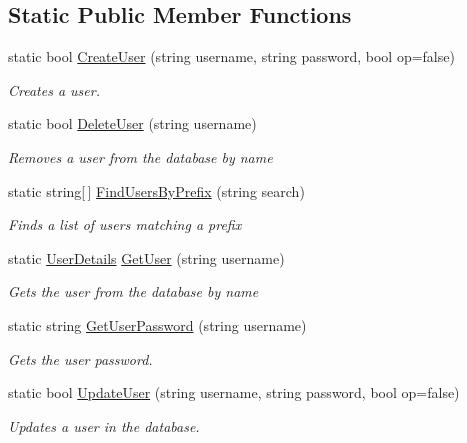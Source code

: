 \subsection*{Static Public Member Functions}
\begin{DoxyCompactItemize}
\item 
static bool \hyperlink{classOTA_1_1Data_1_1AuthenticatedUsers_aea3a1899697ab77fa32d5fa7bffdae7a}{Create\+User} (string username, string password, bool op=false)
\begin{DoxyCompactList}\small\item\em Creates a user. \end{DoxyCompactList}\item 
static bool \hyperlink{classOTA_1_1Data_1_1AuthenticatedUsers_a1cea5a0e7137a60a0fa4a75dc58d93a2}{Delete\+User} (string username)
\begin{DoxyCompactList}\small\item\em Removes a user from the database by name \end{DoxyCompactList}\item 
static string\mbox{[}$\,$\mbox{]} \hyperlink{classOTA_1_1Data_1_1AuthenticatedUsers_ad1cb6c1e7e101243cf1aef7f334048e4}{Find\+Users\+By\+Prefix} (string search)
\begin{DoxyCompactList}\small\item\em Finds a list of users matching a prefix \end{DoxyCompactList}\item 
static \hyperlink{structOTA_1_1Data_1_1UserDetails}{User\+Details} \hyperlink{classOTA_1_1Data_1_1AuthenticatedUsers_affa1cab8b0a215d5941b5aeecb7de46f}{Get\+User} (string username)
\begin{DoxyCompactList}\small\item\em Gets the user from the database by name \end{DoxyCompactList}\item 
static string \hyperlink{classOTA_1_1Data_1_1AuthenticatedUsers_a30b3c7fd6e354116a5f28d2562a16650}{Get\+User\+Password} (string username)
\begin{DoxyCompactList}\small\item\em Gets the user password. \end{DoxyCompactList}\item 
static bool \hyperlink{classOTA_1_1Data_1_1AuthenticatedUsers_a53339a4f1f63724a5744f03867b94d4d}{Update\+User} (string username, string password, bool op=false)
\begin{DoxyCompactList}\small\item\em Updates a user in the database. \end{DoxyCompactList}\item 

\end{DoxyCompactItemize}
